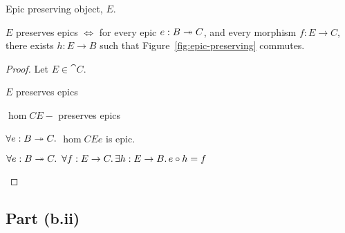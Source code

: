 \begin{marginfigure}
  \caption{Epic preserving object, $E$.}\label{fig:epic-preserving}
\end{marginfigure}

\begin{prop}\label{prop:epic-preserving}
  $E$ preserves epics $\iff$ for every epic $e : B \twoheadrightarrow C$, and every morphism $f : E \to C$, there exists $h : E \to B$ such that Figure~\ref{fig:epic-preserving} commutes.

  \begin{proof}
    Let $E\in\cat{C}$.
    \begin{itemize}
      \step
        $E$ preserves epics
        \marginnote{\Hyp}

      \step[\iffs]
        $\hom{C}{E}{-}$ preserves epics

      \step[\iffs]
        $\forall e : B \twoheadrightarrow C\ldotp$ $\hom{C}{E}{e}$ is epic.

      \step[\iffs]
        $\forall e : B\twoheadrightarrow C\ldotp~\forall f : E \to C\ldotp\exists h : E \to B\ldotp e\circ h = f$
        \qedhere
        \marginnote{\Lemma-\ref{lemma:epic-preserve-2}-(\Lemma-\ref{lemma:epic-preserve-1})}
    \end{itemize}
  \end{proof}
\end{prop}

\subsection{Part (b.ii)}\label{sec:q-1-b-ii}

